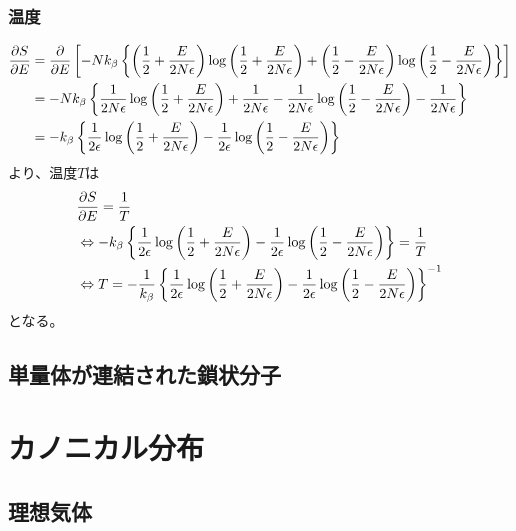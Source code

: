 \documentclass{jsarticle}  %
\numberwithin{equation}{section} %
\numberwithin{figure}{section}
\begin{document}
\subsubsection{温度}
    \begin{align}
        \frac{\partial S}{\partial E} &= \frac{\partial}{\partial E} \left[ -Nk_\beta \left\{ \left( \frac{1}{2} + \frac{E}{2N\epsilon} \right) \log \left( \frac{1}{2} + \frac{E}{2N\epsilon} \right) + \left( \frac{1}{2} - \frac{E}{2N\epsilon} \right) \log \left( \frac{1}{2} - \frac{E}{2N\epsilon} \right) \right\} \right] \notag \\
        &=  -Nk_\beta \left\{ \frac{1}{2N\epsilon} \log \left( \frac{1}{2} + \frac{E}{2N\epsilon} \right) +\frac{1}{2N\epsilon} - \frac{1}{2N\epsilon} \log \left( \frac{1}{2} - \frac{E}{2N\epsilon} \right) -\frac{1}{2N\epsilon} \right\}  \notag \\
        &=  -k_\beta \left\{ \frac{1}{2\epsilon} \log \left( \frac{1}{2} + \frac{E}{2N\epsilon} \right) - \frac{1}{2\epsilon} \log \left( \frac{1}{2} - \frac{E}{2N\epsilon} \right) \right\}  \notag 
    \end{align}
    より、温度$T$は
    \begin{align}
        &\frac{\partial S}{\partial E} = \frac{1}{T} \notag \\
        &\Leftrightarrow -k_\beta \left\{ \frac{1}{2\epsilon} \log \left( \frac{1}{2} + \frac{E}{2N\epsilon} \right) - \frac{1}{2\epsilon} \log \left( \frac{1}{2} - \frac{E}{2N\epsilon} \right) \right\} = \frac{1}{T} \notag \\
        &\Leftrightarrow T = -\frac{1}{k_\beta} \left\{ \frac{1}{2\epsilon} \log \left( \frac{1}{2} + \frac{E}{2N\epsilon} \right) - \frac{1}{2\epsilon} \log \left( \frac{1}{2} - \frac{E}{2N\epsilon} \right) \right\}^{-1}
    \end{align}
    となる。
\subsection{単量体が連結された鎖状分子}
\section{カノニカル分布}
\subsection{理想気体}
\end{document}
